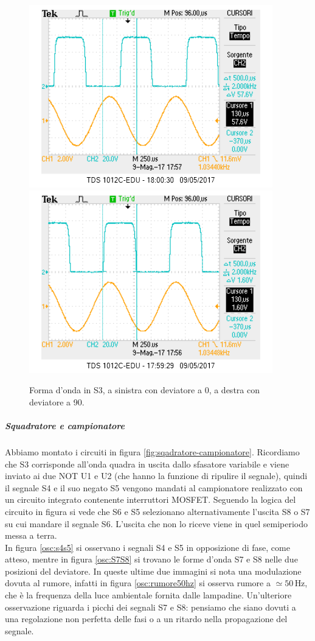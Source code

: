 \documentclass[10pt,a4paper]{article}
\begin{document}
\begin{figure}[!htb]
  \includegraphics[scale=0.75]{deviatore0.png}\includegraphics[scale=0.75]{deviatore90.png}
\caption{Forma d'onda in S3, a sinistra con deviatore a 0\degree, a destra con deviatore a 90\degree.\label{osc:dev}}
\end{figure}

\subparagraph{Squadratore e campionatore}
Abbiamo montato i circuiti in figura \ref{fig:sqadratore-campionatore}. Ricordiamo che S3 corrisponde all'onda quadra in uscita dallo sfasatore variabile e viene inviato ai due NOT U1 e U2 (che hanno la funzione di ripulire il segnale), quindi il segnale S4 e il suo negato S5 vengono mandati al campionatore realizzato con un circuito integrato contenente interruttori MOSFET. Seguendo la logica del circuito in figura si vede che S6 e S5 selezionano alternativamente l'uscita S8 o S7 su cui mandare il segnale S6. L'uscita che non lo riceve viene in quel semiperiodo messa a terra.\\
In figura \ref{osc:s4s5} si osservano i segnali S4 e S5 in opposizione di fase, come atteso, mentre in figura \ref{osc:S7S8} si trovano le forme d'onda S7 e S8 nelle due posizioni del deviatore. In queste ultime due immagini si nota una modulazione dovuta al rumore, infatti in figura \ref{osc:rumore50hz} si osserva rumore a $\simeq 50\,\mbox{Hz}$, che è la frequenza della luce ambientale fornita dalle lampadine. %
Un'ulteriore osservazione riguarda i picchi dei segnali S7 e S8: pensiamo che siano dovuti a una regolazione non perfetta delle fasi o a un ritardo nella propagazione del segnale.
\end{document}
